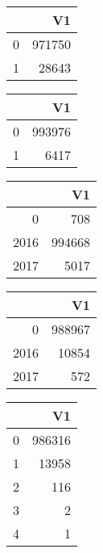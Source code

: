 \bigskip\bigskip
\centering
\begin{tabular}{rr}
  \hline
 & V1 \\ 
  \hline
0 & 971750 \\ 
  1 & 28643 \\ 
   \hline
\end{tabular}

\bigskip\bigskip
\centering
\begin{tabular}{rr}
  \hline
 & V1 \\ 
  \hline
0 & 993976 \\ 
  1 & 6417 \\ 
   \hline
\end{tabular}

\bigskip\bigskip
\centering
\begin{tabular}{rr}
  \hline
 & V1 \\ 
  \hline
0 & 708 \\ 
  2016 & 994668 \\ 
  2017 & 5017 \\ 
   \hline
\end{tabular}

\bigskip\bigskip
\centering
\begin{tabular}{rr}
  \hline
 & V1 \\ 
  \hline
0 & 988967 \\ 
  2016 & 10854 \\ 
  2017 & 572 \\ 
   \hline
\end{tabular}

\bigskip\bigskip
\centering
\begin{tabular}{rr}
  \hline
 & V1 \\ 
  \hline
0 & 986316 \\ 
  1 & 13958 \\ 
  2 & 116 \\ 
  3 &   2 \\ 
  4 &   1 \\ 
   \hline
\end{tabular}


